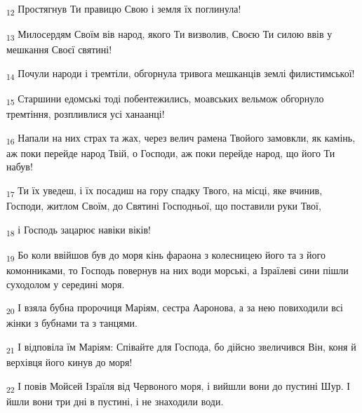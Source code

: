 \begin{tcolorbox}
\textsubscript{12} Простягнув Ти правицю Свою і земля їх поглинула!
\end{tcolorbox}
\begin{tcolorbox}
\textsubscript{13} Милосердям Своїм вів народ, якого Ти визволив, Своєю Ти силою ввів у мешкання Своєї святині!
\end{tcolorbox}
\begin{tcolorbox}
\textsubscript{14} Почули народи і тремтіли, обгорнула тривога мешканців землі филистимської!
\end{tcolorbox}
\begin{tcolorbox}
\textsubscript{15} Старшини едомські тоді побентежились, моавських вельмож обгорнуло тремтіння, розпливлися усі ханаанці!
\end{tcolorbox}
\begin{tcolorbox}
\textsubscript{16} Напали на них страх та жах, через велич рамена Твойого замовкли, як камінь, аж поки перейде народ Твій, о Господи, аж поки перейде народ, що його Ти набув!
\end{tcolorbox}
\begin{tcolorbox}
\textsubscript{17} Ти їх уведеш, і їх посадиш на гору спадку Твого, на місці, яке вчинив, Господи, житлом Своїм, до Святині Господньої, що поставили руки Твої,
\end{tcolorbox}
\begin{tcolorbox}
\textsubscript{18} і Господь зацарює навіки віків!
\end{tcolorbox}
\begin{tcolorbox}
\textsubscript{19} Бо коли ввійшов був до моря кінь фараона з колесницею його та з його комонниками, то Господь повернув на них води морські, а Ізраїлеві сини пішли суходолом у середині моря.
\end{tcolorbox}
\begin{tcolorbox}
\textsubscript{20} І взяла бубна пророчиця Маріям, сестра Ааронова, а за нею повиходили всі жінки з бубнами та з танцями.
\end{tcolorbox}
\begin{tcolorbox}
\textsubscript{21} І відповіла їм Маріям: Співайте для Господа, бо дійсно звеличився Він, коня й верхівця його кинув до моря!
\end{tcolorbox}
\begin{tcolorbox}
\textsubscript{22} І повів Мойсей Ізраїля від Червоного моря, і вийшли вони до пустині Шур. І йшли вони три дні в пустині, і не знаходили води.
\end{tcolorbox}
